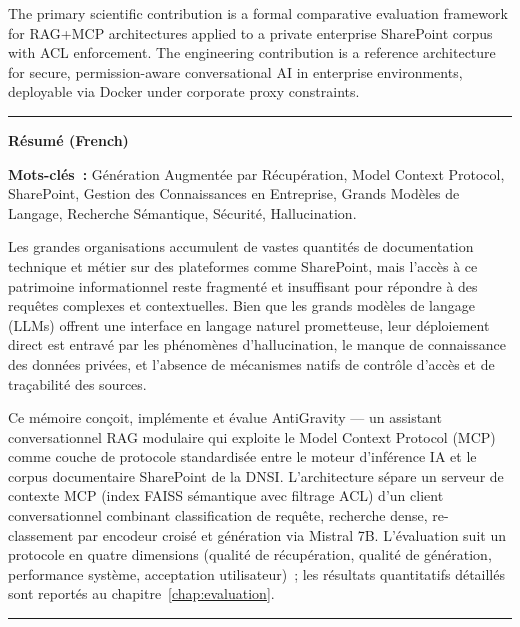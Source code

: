 The primary scientific contribution is a formal comparative evaluation framework for RAG+MCP architectures applied to a private enterprise SharePoint corpus with ACL enforcement. The engineering contribution is a reference architecture for secure, permission-aware conversational AI in enterprise environments, deployable via Docker under corporate proxy constraints.

\bigskip

\noindent\rule{\textwidth}{0.4pt}

\bigskip

\textbf{R\'{e}sum\'{e} (French)}

\textbf{Mots-cl\'{e}s~:} G\'{e}n\'{e}ration Augment\'{e}e par R\'{e}cup\'{e}ration, Model Context Protocol, SharePoint, Gestion des Connaissances en Entreprise, Grands Mod\`{e}les de Langage, Recherche S\'{e}mantique, S\'{e}curit\'{e}, Hallucination.

\bigskip

Les grandes organisations accumulent de vastes quantit\'{e}s de documentation technique et m\'{e}tier sur des plateformes comme SharePoint, mais l'acc\`{e}s \`{a} ce patrimoine informationnel reste fragment\'{e} et insuffisant pour r\'{e}pondre \`{a} des requ\^{e}tes complexes et contextuelles. Bien que les grands mod\`{e}les de langage (LLMs) offrent une interface en langage naturel prometteuse, leur d\'{e}ploiement direct est entrav\'{e} par les ph\'{e}nom\`{e}nes d'hallucination, le manque de connaissance des donn\'{e}es priv\'{e}es, et l'absence de m\'{e}canismes natifs de contr\^{o}le d'acc\`{e}s et de tra\c{c}abilit\'{e} des sources.

Ce m\'{e}moire con\c{c}oit, impl\'{e}mente et \'{e}value AntiGravity --- un assistant conversationnel RAG modulaire qui exploite le Model Context Protocol (MCP) comme couche de protocole standardis\'{e}e entre le moteur d'inf\'{e}rence IA et le corpus documentaire SharePoint de la DNSI. L'architecture s\'{e}pare un serveur de contexte MCP (index FAISS s\'{e}mantique avec filtrage ACL) d'un client conversationnel combinant classification de requ\^{e}te, recherche dense, re-classement par encodeur crois\'{e} et g\'{e}n\'{e}ration via Mistral 7B. L'\'{e}valuation suit un protocole en quatre dimensions (qualit\'{e} de r\'{e}cup\'{e}ration, qualit\'{e} de g\'{e}n\'{e}ration, performance syst\`{e}me, acceptation utilisateur)~; les r\'{e}sultats quantitatifs d\'{e}taill\'{e}s sont report\'{e}s au chapitre~\ref{chap:evaluation}.


\bigskip
\noindent\rule{\textwidth}{0.4pt}
